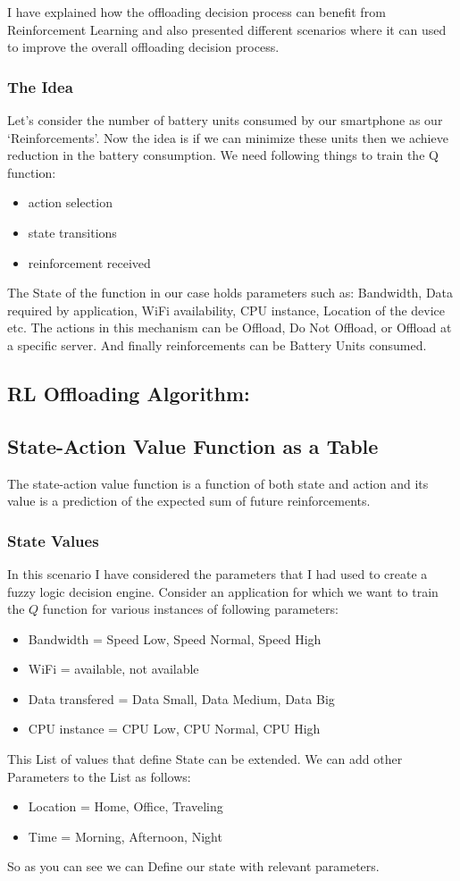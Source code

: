\documentclass[12pt]{report}
\begin{document}
I have explained how the offloading decision process can benefit from Reinforcement Learning and also presented different scenarios where it can used to improve the overall offloading decision process. 
\subsubsection{The Idea}
Let's consider the number of battery units consumed by our smartphone as our `Reinforcements'. Now the idea is if we can minimize these units then we achieve reduction in the battery consumption.
We need following things to train the Q function:
\begin{itemize}
   \item action selection
   \item state transitions
   \item reinforcement received
\end{itemize}
The State of the function in our case holds parameters such as: Bandwidth, Data required by application, WiFi availability, CPU instance, Location of the device etc. The actions in this mechanism can be Offload, Do Not Offload, or Offload at a specific server. And finally reinforcements can be Battery Units consumed.\par
\subsection{RL Offloading Algorithm:}

\subsection{State-Action Value Function as a Table}
The state-action value function is a function of both state and action and its value is a prediction of the expected sum of future reinforcements.
\subsubsection{State Values}
In this scenario I have considered the parameters that I had used to create a fuzzy logic decision engine. Consider an application for which we want to train the $Q$ function for various instances of following parameters:
\begin{itemize}
   \item Bandwidth = Speed Low, Speed Normal, Speed High
   \item WiFi = available, not available
   \item Data transfered = Data Small, Data Medium, Data Big
   \item CPU instance = CPU Low, CPU Normal, CPU High
\end{itemize}
This List of values that define State can be extended. We can add other Parameters to the List as follows:
\begin{itemize}
	\item Location = Home, Office, Traveling
	\item Time = Morning, Afternoon, Night
\end{itemize}
So as you can see we can Define our state with relevant parameters.
\end{document}
